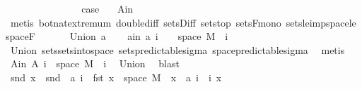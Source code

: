 \begin{isabellebody}
\ \isamarkupfalse%
\isanewline
\ \ \ \ \isamarkupfalse%
\ {}\isanewline
\ \ \ \ \isamarkupfalse%
\ \isamarkupfalse%
\ {\isacharquery}{\kern0pt}case\ \isamarkupfalse%
\ {\isacharasterisk}{\kern0pt}\ A{\isacharunderscore}{\kern0pt}in\ \isamarkupfalse%
\ {\isacharparenleft}{\kern0pt}metis\ bot{\isacharunderscore}{\kern0pt}nat{\isacharunderscore}{\kern0pt}{}{\isachardot}{\kern0pt}extremum\ double{\isacharunderscore}{\kern0pt}diff\ sets{\isachardot}{\kern0pt}Diff\ sets{\isachardot}{\kern0pt}top\ sets{\isacharunderscore}{\kern0pt}F{\isacharunderscore}{\kern0pt}mono\ sets{\isacharunderscore}{\kern0pt}le{\isacharunderscore}{\kern0pt}imp{\isacharunderscore}{\kern0pt}space{\isacharunderscore}{\kern0pt}le\ space{\isacharunderscore}{\kern0pt}F{\isacharparenright}{\kern0pt}\isanewline
\ \ \isacommand{{\isacharbraceright}{\kern0pt}}\isamarkupfalse%
\isanewline
{}\isamarkupfalse%
\isanewline
\ \ \isamarkupfalse%
\ {\isacharparenleft}{\kern0pt}Union\ a{\isacharparenright}{\kern0pt}\isanewline
\ \ \isamarkupfalse%
\ a{\isacharunderscore}{\kern0pt}in{\isacharcolon}{\kern0pt}\ {\isachardoublequoteopen}a\ i\ {\isasymsubseteq}\ {\isacharbraceleft}{\kern0pt}{}{\isachardot}{\kern0pt}{\isachardot}{\kern0pt}{\isacharbraceright}{\kern0pt}\ {\isasymtimes}\ space\ M{\isachardoublequoteclose}\ \ i\ \isamarkupfalse%
\ Union{\isacharparenleft}{\kern0pt}{}{\isacharparenright}{\kern0pt}\ sets{\isachardot}{\kern0pt}sets{\isacharunderscore}{\kern0pt}into{\isacharunderscore}{\kern0pt}space\ sets{\isacharunderscore}{\kern0pt}predictable{\isacharunderscore}{\kern0pt}sigma\ space{\isacharunderscore}{\kern0pt}predictable{\isacharunderscore}{\kern0pt}sigma\ \isamarkupfalse%
\ metis\isanewline
\ \ \isamarkupfalse%
\ A{\isacharunderscore}{\kern0pt}in{\isacharcolon}{\kern0pt}\ {\isachardoublequoteopen}A\ i\ {\isasymsubseteq}\ space\ M{\isachardoublequoteclose}\ \ i\ \isamarkupfalse%
\ Union{\isacharparenleft}{\kern0pt}{}{\isacharparenright}{\kern0pt}\ \isamarkupfalse%
\ blast\isanewline
\ \ \isamarkupfalse%
\ {\isachardoublequoteopen}snd\ x\ {\isasymin}\ snd\ {\isacharbackquote}{\kern0pt}\ {\isacharparenleft}{\kern0pt}a\ i\ {\isasyminter}\ {\isacharparenleft}{\kern0pt}{\isacharbraceleft}{\kern0pt}fst\ x{\isacharbraceright}{\kern0pt}\ {\isasymtimes}\ space\ M{\isacharparenright}{\kern0pt}{\isacharparenright}{\kern0pt}{\isachardoublequoteclose}\ \ {\isachardoublequoteopen}x\ {\isasymin}\ a\ i{\isachardoublequoteclose}\ \ i\ x\ \isamarkupfalse%

\end{isabellebody}
